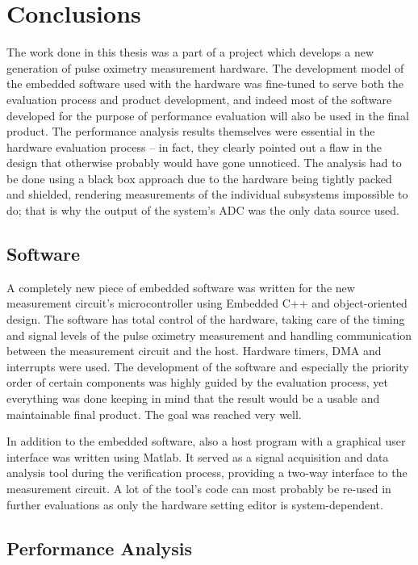 \clearpage
\section{Conclusions}

The work done in this thesis was a part of a project which develops a new generation of pulse oximetry measurement hardware. The development model of the embedded software used with the hardware was fine-tuned to serve both the evaluation process and product development, and indeed most of the software developed for the purpose of performance evaluation will also be used in the final product. The performance analysis results themselves were essential in the hardware evaluation process -- in fact, they clearly pointed out a flaw in the design that otherwise probably would have gone unnoticed. The analysis had to be done using a black box approach due to the hardware being tightly packed and shielded, rendering measurements of the individual subsystems impossible to do; that is why the output of the system's ADC was the only data source used.

\subsection{Software}

A completely new piece of embedded software was written for the new measurement circuit's microcontroller using Embedded C++ and object-oriented design. The software has total control of the hardware, taking care of the timing and signal levels of the pulse oximetry measurement and handling communication between the measurement circuit and the host. Hardware timers, DMA and interrupts were used. The development of the software and especially the priority order of certain components was highly guided by the evaluation process, yet everything was done keeping in mind that the result would be a usable and maintainable final product. The goal was reached very well.

In addition to the embedded software, also a host program with a graphical user interface was written using Matlab. It served as a signal acquisition and data analysis tool during the verification process, providing a two-way interface to the measurement circuit. A lot of the tool's code can most probably be re-used in further evaluations as only the hardware setting editor is system-dependent.

\subsection{Performance Analysis}


